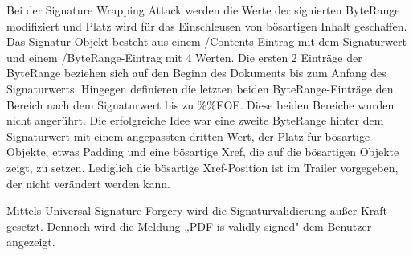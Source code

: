 \par
Bei der Signature Wrapping Attack werden die Werte der signierten ByteRange modifiziert und Platz wird für das Einschleusen von bösartigen Inhalt geschaffen. Das Signatur-Objekt besteht aus einem /Contents-Eintrag mit dem Signaturwert und einem /ByteRange-Eintrag mit 4 Werten. Die ersten 2 Einträge der ByteRange beziehen sich auf den Beginn des Dokuments bis zum Anfang des Signaturwerts. Hingegen definieren die letzten beiden ByteRange-Einträge den Bereich nach dem Signaturwert bis zu \%\%EOF. Diese beiden Bereiche wurden nicht angerührt. Die erfolgreiche Idee war eine zweite ByteRange hinter dem Signaturwert mit einem angepassten dritten Wert, der Platz für bösartige Objekte, etwas Padding und eine bösartige Xref, die auf die bösartigen Objekte zeigt, zu setzen. Lediglich die bösartige Xref-Position ist im Trailer vorgegeben, der nicht verändert werden kann. 
\par
Mittels Universal Signature Forgery wird die Signaturvalidierung außer Kraft gesetzt. Dennoch wird die Meldung „PDF is validly signed" dem Benutzer angezeigt.

